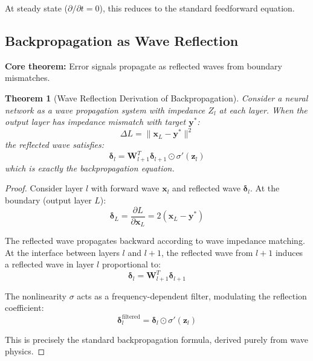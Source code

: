 \documentclass{article}
\newtheorem{theorem}{Theorem}
\begin{document}
At steady state ($\partial/\partial t = 0$), this reduces to the standard feedforward equation.

\subsection{Backpropagation as Wave Reflection}

\textbf{Core theorem:} Error signals propagate as reflected waves from boundary mismatches.

\begin{theorem}[Wave Reflection Derivation of Backpropagation]
\label{thm:wave_backprop}
Consider a neural network as a wave propagation system with impedance $Z_l$ at each layer. When the output layer has impedance mismatch with target $\mathbf{y}^*$:
\begin{equation}
\Delta L = \|\mathbf{x}_L - \mathbf{y}^*\|^2
\end{equation}
the reflected wave satisfies:
\begin{equation}
\boldsymbol{\delta}_l = \mathbf{W}_{l+1}^T \boldsymbol{\delta}_{l+1} \odot \sigma'(\mathbf{z}_l)
\end{equation}
which is exactly the backpropagation equation.
\end{theorem}

\begin{proof}
Consider layer $l$ with forward wave $\mathbf{x}_l$ and reflected wave $\boldsymbol{\delta}_l$. At the boundary (output layer $L$):
\begin{equation}
\boldsymbol{\delta}_L = \frac{\partial L}{\partial \mathbf{x}_L} = 2(\mathbf{x}_L - \mathbf{y}^*)
\end{equation}

The reflected wave propagates backward according to wave impedance matching. At the interface between layers $l$ and $l+1$, the reflected wave from $l+1$ induces a reflected wave in layer $l$ proportional to:
\begin{equation}
\boldsymbol{\delta}_l = \mathbf{W}_{l+1}^T \boldsymbol{\delta}_{l+1}
\end{equation}

The nonlinearity $\sigma$ acts as a frequency-dependent filter, modulating the reflection coefficient:
\begin{equation}
\boldsymbol{\delta}_l^{\text{filtered}} = \boldsymbol{\delta}_l \odot \sigma'(\mathbf{z}_l)
\end{equation}

This is precisely the standard backpropagation formula, derived purely from wave physics.
\end{proof}
\end{document}
